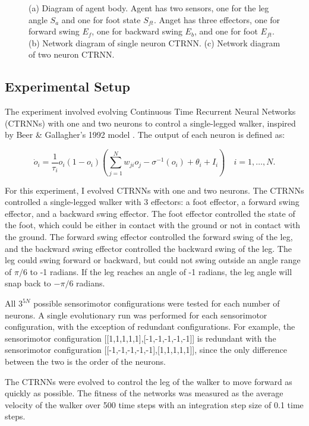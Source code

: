 \documentclass{article}
\begin{document}
\begin{figure}[htbp]
\begin{subfigure}[b]{0.41\textwidth}
    \caption{}
    \label{fig:N2Plot}
  \end{subfigure}
  \caption{(a) Diagram of agent body. Agent has two sensors, one for the leg angle $S_{a}$ and one for foot state $S_{ft}$. Anget has three effectors, one for forward swing $E_{f}$, one for backward swing $E_{b}$, and one for foot $E_{ft}$. (b) Network diagram of single neuron CTRNN. (c) Network diagram of two neuron CTRNN.}
  \label{fig:NetPlot}
\end{figure}

\subsection{Experimental Setup} The experiment involved evolving Continuous Time Recurrent Neural Networks (CTRNNs) with one and two neurons to control a single-legged walker, inspired by Beer \& Gallagher's 1992 model \cite{BeerWalker}. The output of each neuron is defined as:

\begin{equation}
  \dot{o}_i = \frac{1}{\tau_i} o_i(1 - o_i)\left(\sum_{j=1}^{N} w_{ji}o_j - \sigma^{-1}(o_i) + \theta_i + I_i \right) \quad i = 1, \dots, N.
\end{equation}

For this experiment, I evolved CTRNNs with one and two neurons. The CTRNNs controlled a single-legged walker with 3 effectors: a foot effector, a forward swing effector, and a backward swing effector. The foot effector controlled the state of the foot, which could be either in contact with the ground or not in contact with the ground. The forward swing effector controlled the forward swing of the leg, and the backward swing effector controlled the backward swing of the leg. The leg could swing forward or backward, but could not swing outside an angle range of \(\pi/6\) to -1 radians. If the leg reaches an angle of -1 radians, the leg angle will snap back to \(-\pi/6\) radians.

All \(3^{5N}\) possible sensorimotor configurations were tested for each number of neurons. A single evolutionary run was performed for each sensorimotor configuration, with the exception of redundant configurations. For example, the sensorimotor configuration [[1,1,1,1,1],[-1,-1,-1,-1,-1]] is redundant with the sensorimotor configuration [[-1,-1,-1,-1,-1],[1,1,1,1,1]], since the only difference between the two is the order of the neurons. 

The CTRNNs were evolved to control the leg of the walker to move forward as quickly as possible. The fitness of the networks was measured as the average velocity of the walker over 500 time steps with an integration step size of 0.1 time steps.
\end{document}
